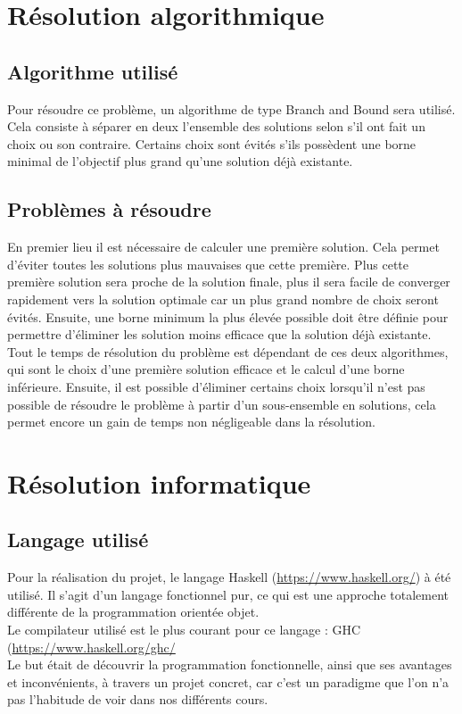 \documentclass[a4paper, 12pt]{report}
\begin{document}
\chapter{Résolution algorithmique}
\section{Algorithme utilisé}

Pour résoudre ce problème, un algorithme de type Branch and Bound sera utilisé.
Cela consiste à séparer en deux l'ensemble des solutions selon s'il ont fait un choix ou son contraire.
Certains choix sont évités s'ils possèdent une borne minimal de l'objectif plus grand qu'une solution déjà existante. 

\section{Problèmes à résoudre}
En premier lieu il est nécessaire de calculer une première solution. 
Cela permet d'éviter toutes les solutions plus mauvaises que cette première.
Plus cette première solution sera proche de la solution finale, 
plus il sera facile de converger rapidement vers la solution optimale car un plus grand nombre de choix seront évités.
\newline{}
\newline{}
Ensuite, une borne minimum la plus élevée possible doit être définie 
pour permettre d'éliminer les solution moins efficace que la solution déjà existante. 
Tout le temps de résolution du problème est dépendant de ces deux algorithmes, 
qui sont le choix d'une première solution efficace et le calcul d'une borne inférieure. 
\newline{}
\newline{}
Ensuite, il est possible d'éliminer certains choix lorsqu'il n'est pas possible de résoudre le problème 
à partir d'un sous-ensemble en solutions, cela permet encore un gain de temps non négligeable dans la résolution.

\chapter{Résolution informatique}
\section{Langage utilisé}
Pour la réalisation du projet, le langage Haskell (\url{https://www.haskell.org/}) à été utilisé. 
Il s'agit d'un langage fonctionnel pur, ce qui est une approche 
totalement différente de la programmation orientée objet. \\
Le compilateur utilisé est le plus courant pour ce langage : GHC (\url{https://www.haskell.org/ghc/}\\
Le but était de découvrir la programmation fonctionnelle, ainsi que ses avantages et inconvénients, à travers un projet concret, 
car c'est un paradigme que l'on n'a pas l'habitude de voir dans nos différents cours. 
\end{document}
